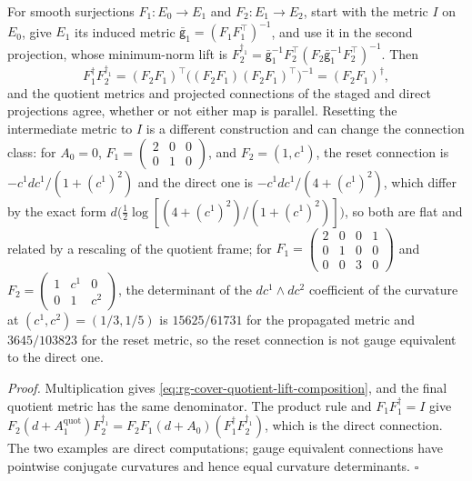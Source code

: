 For smooth surjections \(F_1:E_0\to E_1\) and \(F_2:E_1\to E_2\), start with the
metric \(I\) on \(E_0\), give \(E_1\) its induced metric
\(\bar{\mathsf g}_1=(F_1F_1^\top)^{-1}\), and use it in the second projection,
whose minimum-norm lift is
\(F_2^{\dagger_1}=\bar{\mathsf g}_1^{-1}F_2^\top(F_2\bar{\mathsf g}_1^{-1}F_2^\top)^{-1}\).
Then
\begin{equation}
 F_1^\dagger F_2^{\dagger_1}=(F_2F_1)^\top\bigl((F_2F_1)(F_2F_1)^\top\bigr)^{-1}=(F_2F_1)^\dagger,
\label{eq:rg-cover-quotient-lift-composition}
\end{equation}
and the quotient metrics and projected connections of the staged and direct
projections agree, whether or not either map is parallel. Resetting the
intermediate metric to \(I\) is a different construction and can change the
connection class: for \(A_0=0\),
\(F_1=\left(\begin{smallmatrix}2&0&0\\0&1&0\end{smallmatrix}\right)\), and
\(F_2=(1,c^1)\), the reset connection is \(-c^1dc^1/(1+(c^1)^2)\) and the direct
one is \(-c^1dc^1/(4+(c^1)^2)\), which differ by the exact form
\(d\bigl(\tfrac12\log[(4+(c^1)^2)/(1+(c^1)^2)]\bigr)\), so both are flat and
related by a rescaling of the quotient frame; for
\(F_1=\left(\begin{smallmatrix}2&0&0&1\\0&1&0&0\\0&0&3&0\end{smallmatrix}\right)\)
and \(F_2=\left(\begin{smallmatrix}1&c^1&0\\0&1&c^2\end{smallmatrix}\right)\), the
determinant of the \(dc^1\wedge dc^2\) coefficient of the curvature at
\((c^1,c^2)=(1/3,1/5)\) is \(15625/61731\) for the propagated metric and
\(3645/103823\) for the reset metric, so the reset connection is not gauge
equivalent to the direct one. 

\noindent\emph{Proof.}
Multiplication gives \eqref{eq:rg-cover-quotient-lift-composition}, and the final
quotient metric has the same denominator. The product rule and
\(F_1F_1^\dagger=I\) give
\(F_2(d+A^{\mathrm{quot}}_1)F_2^{\dagger_1}=F_2F_1(d+A_0)(F_1^\dagger F_2^{\dagger_1})\),
which is the direct connection. The two examples are direct computations; gauge
equivalent connections have pointwise conjugate curvatures and hence equal
curvature determinants. \(\square\)

